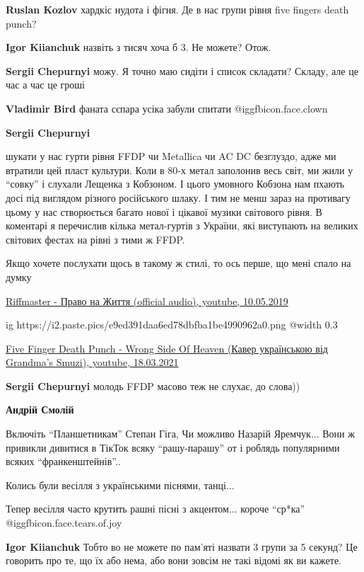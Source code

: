 \begin{itemize}
\begin{itemize}
\textbf{Ruslan Kozlov} хардкіс нудота і фігня. Де в нас групи рівня five fingers death punch?

\textbf{Igor Kiianchuk} назвіть з тисяч хоча б 3. Не можете? Отож.

\textbf{Sergii Chepurnyi} можу. Я точно маю сидіти і список складати? Складу, але це час а час це гроші

\textbf{Vladimir Bird} фаната сєпара усіка забули спитати  @igg{fbicon.face.clown} 

\textbf{Sergii Chepurnyi} 

шукати у нас гурти рівня FFDP чи Metallica чи AC DC безглуздо, адже ми втратили
цей пласт культури. Коли в 80-х метал заполонив весь світ, ми жили у \enquote{совку} і
слухали Лещенка з Кобзоном. І цього умовного Кобзона нам пхають досі під
виглядом різного російського шлаку. І тим не менш зараз на противагу цьому у
нас створюється багато нової і цікавої музики світового рівня. В коментарі я
перечислив кілька метал-гуртів з України, які виступають на великих світових
фестах на рівні з тими ж FFDP.

Якщо хочете послухати щось в такому ж стилі, то ось перше, що мені спало на думку

\href{https://www.youtube.com/watch?v=K1oinA8TNLQ}{%
Riffmaster - Право на Життя (official audio), youtube, 10.05.2019%
}

\ifcmt
  ig https://i2.paste.pics/e9ed391daa6ed78dbfba1be4990962a0.png
  @width 0.3
\fi

\href{https://www.youtube.com/watch?v=Jgn3_0ZbDb8}{%
Five Finger Death Punch - Wrong Side Of Heaven (Кавер українською від Grandma's Smuzi), %
youtube, 18.03.2021%
}

\textbf{Sergii Chepurnyi} молодь FFDP масово теж не слухає, до слова))

\textbf{Андрій Смолій} 

Включіть \enquote{Планшетникам} Степан Гіга, Чи можливо Назарій Яремчук... Вони ж
привикли дивитися в ТікТок всяку \enquote{рашу-парашу} от і роблядь популярними всяких
\enquote{франкенштейнів}..

Колись були весілля з українськими піснями, танці...

Тепер весілля часто крутить рашні пісні з акцентом...  короче \enquote{ср*ка} @igg{fbicon.face.tears.of.joy} 

\textbf{Igor Kiianchuk} Тобто во не можете по пам’яті назвати 3 групи за 5 секунд? Це говорить про те, що їх або нема, або вони зовсім не такі відомі як ви кажете.


\end{itemize}
\end{itemize}
